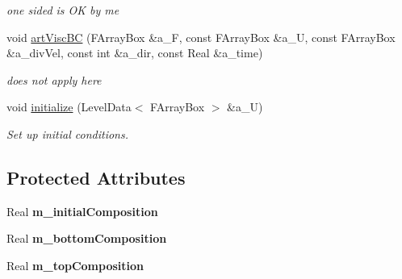 \begin{DoxyCompactItemize}
\begin{DoxyCompactList}\small\item\em one sided is O\-K by me \end{DoxyCompactList}\item 
\hypertarget{class_advect_conc_i_b_c_a789862018a5908054618d27767d2abf1}{void \hyperlink{class_advect_conc_i_b_c_a789862018a5908054618d27767d2abf1}{art\-Visc\-B\-C} (F\-Array\-Box \&a\-\_\-\-F, const F\-Array\-Box \&a\-\_\-\-U, const F\-Array\-Box \&a\-\_\-div\-Vel, const int \&a\-\_\-dir, const Real \&a\-\_\-time)}\label{class_advect_conc_i_b_c_a789862018a5908054618d27767d2abf1}

\begin{DoxyCompactList}\small\item\em does not apply here \end{DoxyCompactList}\item 
\hypertarget{class_advect_conc_i_b_c_aa480fb54ae872e195b2fcb92b3088783}{void \hyperlink{class_advect_conc_i_b_c_aa480fb54ae872e195b2fcb92b3088783}{initialize} (Level\-Data$<$ F\-Array\-Box $>$ \&a\-\_\-\-U)}\label{class_advect_conc_i_b_c_aa480fb54ae872e195b2fcb92b3088783}

\begin{DoxyCompactList}\small\item\em Set up initial conditions. \end{DoxyCompactList}\end{DoxyCompactItemize}
\subsection*{Protected Attributes}
\begin{DoxyCompactItemize}
\item 
\hypertarget{class_advect_conc_i_b_c_a6a2947c39ee276d951379beabc761137}{Real {\bfseries m\-\_\-initial\-Composition}}\label{class_advect_conc_i_b_c_a6a2947c39ee276d951379beabc761137}

\item 
\hypertarget{class_advect_conc_i_b_c_ab8ef47aaf37b5d17d0b4c904ac5cafbe}{Real {\bfseries m\-\_\-bottom\-Composition}}\label{class_advect_conc_i_b_c_ab8ef47aaf37b5d17d0b4c904ac5cafbe}

\item 
\hypertarget{class_advect_conc_i_b_c_a8f75b31a84588092d4aaa1aaa79d63aa}{Real {\bfseries m\-\_\-top\-Composition}}\label{class_advect_conc_i_b_c_a8f75b31a84588092d4aaa1aaa79d63aa}

\end{DoxyCompactItemize}



